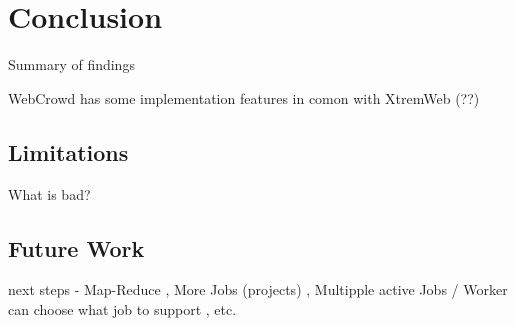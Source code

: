\chapter{Conclusion}
\label{ch:conclusion}
Summary of findings

WebCrowd has some implementation features in comon with XtremWeb (??)

\section{Limitations}
\label{sec:conclusion:limitations}
What is bad?

\section{Future Work}
\label{sec:conclusion:future_work}
next steps - Map-Reduce , More Jobs (projects) , Multipple active Jobs / Worker can choose what job to support , etc.
